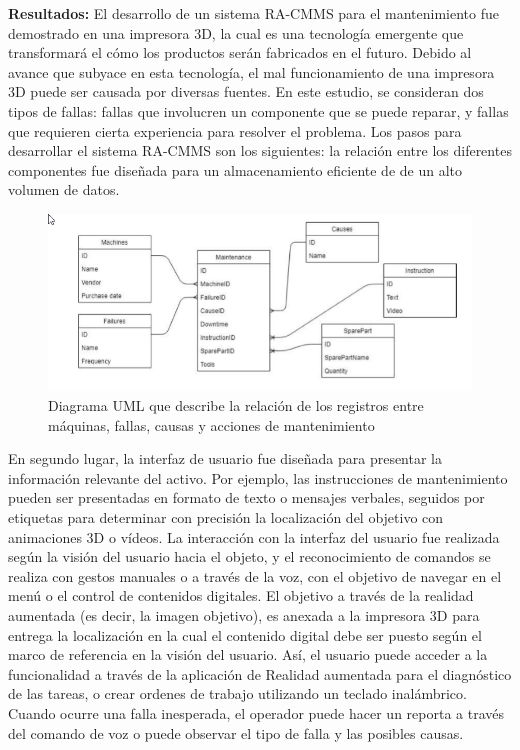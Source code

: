 \begin{description}
\item \textbf{Resultados:} El desarrollo de un sistema RA-CMMS para el mantenimiento fue demostrado en una impresora 3D, la cual es una tecnología emergente que transformará el cómo los productos serán fabricados en el futuro. Debido al avance que subyace en esta tecnología, el mal funcionamiento de una impresora 3D puede ser causada por diversas fuentes. En este estudio, se consideran dos tipos de fallas: fallas que involucren un componente que se puede reparar, y fallas que requieren cierta experiencia para resolver el problema. Los pasos para desarrollar el sistema RA-CMMS son los siguientes: la relación entre los diferentes componentes fue diseñada para un almacenamiento eficiente de de un alto volumen de datos.

\begin{figure}[H]
\centering
\includegraphics[scale=0.7]{images/umlra.png}
\caption{Diagrama UML que describe la relación de los registros entre máquinas, fallas, causas y acciones de mantenimiento \citep{aransyash2019}}
\end{figure}




En segundo lugar, la interfaz de usuario fue diseñada para presentar la información relevante del activo. Por ejemplo, las instrucciones de mantenimiento pueden ser presentadas en formato de texto o mensajes verbales, seguidos por etiquetas para determinar con precisión la localización del objetivo con animaciones 3D o vídeos. La interacción con la interfaz del usuario fue realizada según la visión del usuario hacia el objeto, y el reconocimiento de comandos se realiza con gestos manuales o a través de la voz, con el objetivo de navegar en el menú o el control de contenidos digitales. El objetivo a través de la realidad aumentada (es decir, la imagen objetivo), es anexada a la impresora 3D para entrega la localización en la cual el contenido digital debe ser puesto según el marco de referencia en la visión del usuario. Así, el usuario puede acceder a la funcionalidad a través de la aplicación de Realidad aumentada para el diagnóstico de las tareas, o crear ordenes de trabajo utilizando un teclado inalámbrico. Cuando ocurre una falla inesperada, el operador puede hacer un reporta a través del comando de voz o puede observar el tipo de falla y las posibles causas.


\end{description}
